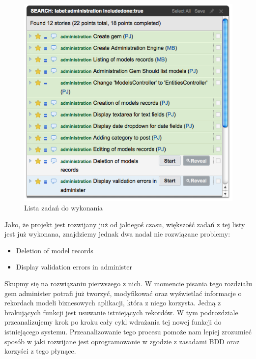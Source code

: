     \begin{figure}
  		\begin{center}
  			\includegraphics[width=\linewidth]{images/administer_stories_list.png}
  			\caption{Lista zadań do wykonania}
  			\label{administer_stories}
  		\end{center}
  	\end{figure}
  	
    Jako, że projekt jest rozwijany już od jakiegoś czasu, większość zadań z tej listy jest już wykonana, znajdziemy jednak dwa nadal nie rozwiązane problemy:
    
    \begin{itemize}
      \item Deletion of model records
      \item Display validation errors in administer
    \end{itemize}
    
    Skupmy się na rozwiązaniu pierwszego z nich. W momencie pisania tego rozdziału gem administer potrafi już tworzyć, modyfikować oraz wyświetlać informacje o rekordach modeli biznesowych aplikacji, która z niego korzysta. Jedną z brakujących funkcji jest usuwanie istniejących rekordów. W tym podrozdziale przeanalizujemy krok po kroku cały cykl wdrażania tej nowej funkcji do istniejącego systemu. Przeanalizowanie tego procesu pomoże nam lepiej zrozumieć sposób w jaki rozwijane jest oprogramowanie w zgodzie z zasadami BDD oraz korzyści z tego płynące.
    
